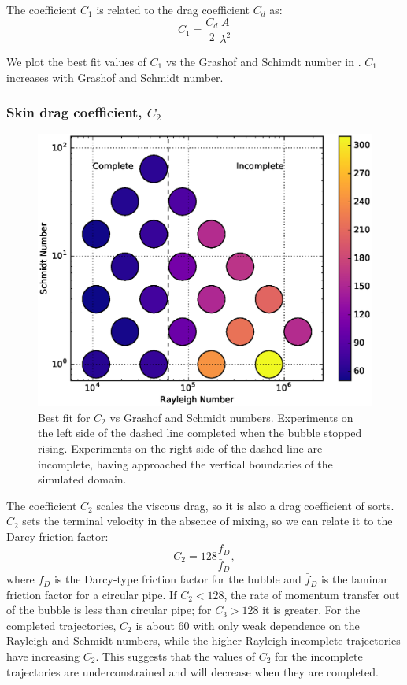 The coefficient $C_1$ is related to the drag coefficient $C_d$ as:
\begin{equation}
C_1 = \frac{C_d}{2} \frac{A}{\lambda^2}
\end{equation}

We plot the best fit values of $C_1$ vs the Grashof and Schimdt number in .
$C_1$ increases with Grashof and Schmidt number.

\subsubsection{Skin drag coefficient, $C_2$}
\begin{figure}
\includegraphics[width=\columnwidth]{figs/C2-vs-Rayleigh-Schmidt}
\caption{ 
  Best fit for $C_2$ vs Grashof and Schmidt numbers.
  Experiments on the left side of the dashed line completed when the bubble stopped rising.
  Experiments on the right side of the dashed line are incomplete, having approached the vertical boundaries of the simulated domain.
}
\end{figure}

The coefficient $C_2$ scales the viscous drag, so it is also a drag coefficient of sorts.
$C_2$ sets the terminal velocity in the absence of mixing, so we can relate it to the Darcy friction factor:
\begin{equation}
C_2 = 128 \frac{f_D}{\bar{f}_D},
\end{equation}
where $f_D$ is the Darcy-type friction factor for the bubble and $\bar{f}_D$ is the laminar friction factor for a circular pipe.
If $C_2 < 128$, the rate of momentum transfer out of the bubble is less than circular pipe; for $C_3 > 128$ it is greater.
For the completed trajectories, $C_2$ is about $60$ with only weak dependence on the Rayleigh and Schmidt numbers, while the higher Rayleigh incomplete trajectories have increasing $C_2$.
This suggests that the values of $C_2$ for the incomplete trajectories are underconstrained and will decrease when they are completed.


